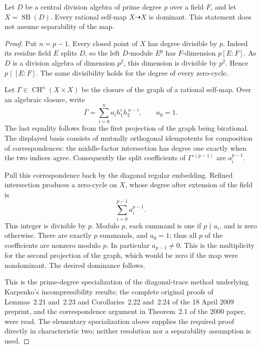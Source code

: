 \begin{lemma}
\label{lem:prime-Severi-Brauer-diagonal-trace}
Let \(D\) be a central division algebra of prime degree \(p\)
over a field \(F\), and let \(X=\operatorname{SB}(D)\).
Every rational self-map \(X\dashrightarrow X\) is dominant.
This statement does not assume separability of the map.
\end{lemma}
\begin{proof}
Put \(n=p-1\). Every closed point of \(X\) has degree divisible
by \(p\). Indeed its residue field \(E\) splits \(D\), so the
left \(D\)-module \(E^p\) has \(F\)-dimension \(p[E:F]\).
As \(D\) is a division algebra of dimension \(p^2\), this
dimension is divisible by \(p^2\). Hence \(p\mid[E:F]\).
The same divisibility holds for the degree of every zero-cycle.

Let \(\Gamma\in\operatorname{CH}^n(X\times X)\) be the closure
of the graph of a rational self-map. Over an algebraic closure,
write
\[
 \overline\Gamma=\sum_{i=0}^{n}a_i h_1^i h_2^{\,n-i},
                 \qquad a_0=1.                 \tag{PHR7}
\]
The last equality follows from the first projection of the graph
being birational. The displayed basis consists of mutually
orthogonal idempotents for composition of correspondences:
the middle-factor intersection has degree one exactly when
the two indices agree. Consequently the split coefficients of
\(\Gamma^{\circ(p-1)}\) are \(a_i^{p-1}\).

Pull this correspondence back by the diagonal regular embedding.
Refined intersection produces a zero-cycle on \(X\), whose
degree after extension of the field is
\[
                         \sum_{i=0}^{p-1}a_i^{p-1}.
                                                        \tag{PHR8}
\]
This integer is divisible by \(p\). Modulo \(p\), each summand
is one if \(p\nmid a_i\), and is zero otherwise. There are
exactly \(p\) summands, and \(a_0=1\); thus all \(p\) of the
coefficients are nonzero modulo \(p\). In particular
\(a_{p-1}\ne0\). This is the multiplicity for the second
projection of the graph, which would be zero if the map were
nondominant. The desired dominance follows.

This is the prime-degree specialization of the diagonal-trace
method underlying Karpenko's incompressibility results; the
complete original proofs of Lemmas~2.21 and~2.23 and Corollaries~2.22 and~2.24
of the 18 April 2009 preprint, and the correspondence argument
in Theorem~2.1 of the 2000 paper, were read. The elementary
specialization above supplies the required proof directly in
characteristic two; neither resolution nor a separability
assumption is used.
\end{proof}

